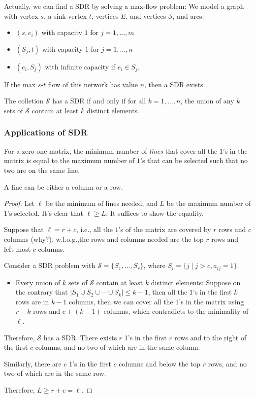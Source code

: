 Actually, we can find a SDR by solving a max-flow problem:
We model a graph with vertex $s$, a sink vertex $t$, vertices $E$, and vertices $\mathcal{S}$, and arcs:
\begin{itemize}
\item
$(s,e_i)$ with capacity $1$ for $j=1,\dots,m$
\item
$(S_j,t)$ with capacity $1$ for $j=1,\dots,n$
\item
$(e_i,S_j)$ with infinite capacity if $e_i\in S_j$.
\end{itemize}
If the max $s$-$t$ flow of this network has value $n$, then a SDR exists.
\begin{theorem}[Hall, 1935]
The colletion $\mathcal{S}$ has a SDR if and only if for all $k=1,\dots,n$,
the union of any $k$ sets of $\mathcal{S}$ contain at least $k$ distinct elements.
\end{theorem}
\subsubsection{Applications of SDR}
\begin{theorem}
For a zero-one matrix, the minimum number of \emph{lines} that cover all the $1$'s in the matrix is equal to the maximum number of $1$'s that can be selected such that no two are on the same line.

A line can be either a column or a row.
\end{theorem}
\begin{proof}
Let $\ell$ be the minimum of lines needed, and $L$ be the maximum number of $1$'s selected.
It's clear that $\ell\ge L$. It suffices to show the equality.

Suppose that $\ell=r+c$, i.e., all the $1$'s of the matrix are covered by $r$ rows and $c$ columns (why?).
w.l.o.g.,the rows and columns needed are the top $r$ rows and left-most $c$ columns.

Consider a SDR problem with $\mathcal{S}=\{S_1,\dots,S_r\}$, where $S_i=\{j\mid j>c,a_{ij}=1\}$.
\begin{itemize}
\item
Every union of $k$ sets of $\mathcal{S}$ contain at least $k$ distinct elements:
Suppose on the contrary that $|S_1\cup S_2\cup\cdots\cup S_k|\le k-1$, then all the $1$'s in the first $k$ rows are in $k-1$ columns, then we can cover all the $1$'s in the matrix using $r-k$ rows and $c+(k-1)$ columns, which contradicts to the minimality of $\ell$.
\end{itemize}
Therefore, $\mathcal{S}$ has a SDR.
There exists $r$ 1's in the first $r$ rows and to the right of the first $c$ columns, and no two of which are in the same column.

Similarly, there are $c$ 1's in the first $c$ columns and below the top $r$ rows, and no two of which are in the same row.

Therefore, $L\ge r+c=\ell$.
\end{proof}



